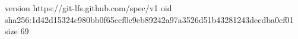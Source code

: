 version https://git-lfs.github.com/spec/v1
oid sha256:1d42d15324c980bb0f65ccf0c9eb89242a97a3526d51b43281243decdba0cf01
size 69
